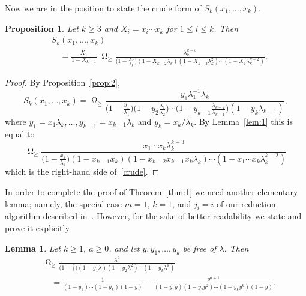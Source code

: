 \documentclass[reqno]{amsart}
\newcommand{\lam}{\lambda}
\DeclareMathOperator*{\Omegaoper}{\Omega}
\newcommand{\Omegaop}{\Omegaoper_{\scriptscriptstyle \geqq}}
\theoremstyle{plain}
\newtheorem{proposition}{Proposition}
\newtheorem{lemma}{Lemma}
\theoremstyle{definition}
\theoremstyle{remark}
\begin{document}
Now we are in the position to state the crude form of $S_k(x_1,\dots,x_k)$.

\begin{proposition} \label{prop:3}
   Let $k \ge 3$ and $X_i=x_i \cdots x_k$ for $1 \le i \le k$. Then
   \begin{equation}\begin{split}\label{crude}
      & S_k(x_1,\dots,x_k) \\
      & \quad = \frac{X_1}{1-X_{k-1}} \; \Omegaop \frac{\lam_k^{k-3}}
      {\big(1-\frac{X_k}{\lam_k}\big)(1-X_{k-2} \lam_k)
      (1-X_{k-3} \lam_k^2)\cdots(1-X_1 \lam_k^{k-2})}.
   \end{split}\end{equation}
\end{proposition}

\begin{proof}
   By Proposition~\ref{prop:2},
   \[
     S_k(x_1,\dots,x_k) =
     \Omegaop \frac{y_1 \lam_1^{-1} \lam_k}
     {\big(1-\frac{y_1}{\lam_1}\big) \big(1-y_2 \frac{\lam_1}{\lam_2}\big)
     \cdots \big(1-y_{k-1} \frac{\lam_{k-2}}{\lam_{k-1}}\big)
     (1-y_k \lam_{k-1})},
   \]
   where $y_1=x_1 \lam_k, \dots, y_{k-1} = x_{k-1} \lam_k$ and
   $y_k=x_k/\lam_k$.
   By Lemma~\ref{lem:1} this is equal to
   \[
     \Omegaop \frac{x_1 \cdots x_k \lam_k^{k-3}}
     {\big(1-\frac{x_k}{\lam_k}\big) (1-x_{k-1} x_k)
     (1-x_{k-2} x_{k-1} x_k \lam_k) \cdots (1-x_1 \cdots x_k \lam_k^{k-2})}
   \]
   which is the right-hand side of~\eqref{crude}.
\end{proof}

In order to complete the proof of Theorem~\ref{thm:1} we need another
elementary lemma;
namely, the special case $m=1$, $k=1$, and $j_i=i$ of our reduction algorithm
described in~\cite{APR:Omega6}.
However, for the sake of better readability we state and prove it
explicitly.

\begin{lemma} \label{lem:2}
   Let $k \ge 1$, $a \ge 0$, and let $y, y_1, \dots, y_k$ be
   free of $\lam$. Then
   \begin{equation}\begin{split} \label{red}
      & \Omegaop \frac{\lam^a}{\big(1-\frac{y}{\lam}\big)
      (1-y_1 \lam)(1-y_2 \lam^2) \cdots (1-y_k \lam^k)} \\
      & \quad = \frac{1}{(1-y_1)\cdots(1-y_k)(1-y)} -
      \frac{y^{a+1}}{(1-y_1 y)(1-y_2 y^2) \cdots (1-y_k y^k)(1-y)}.
   \end{split}\end{equation}
\end{lemma}
\end{document}
